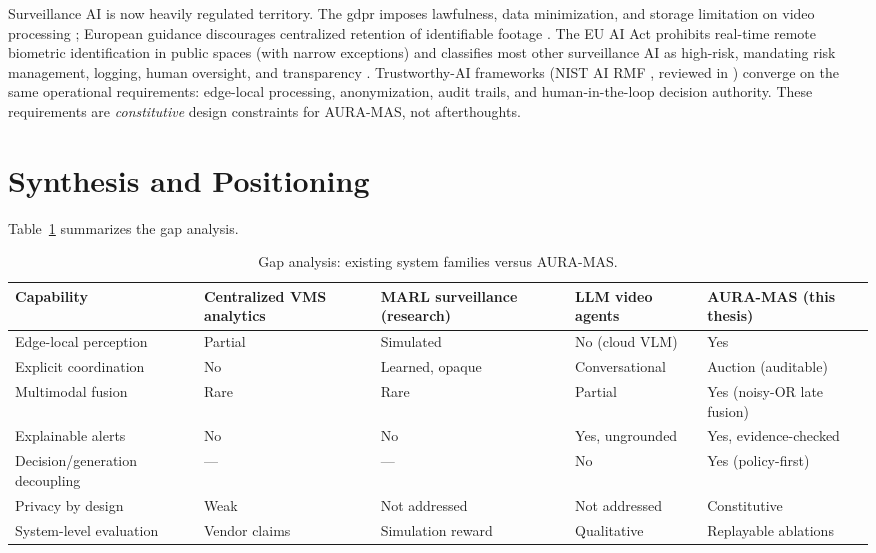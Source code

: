 Surveillance AI is now heavily regulated territory. The \gls{gdpr} imposes lawfulness, data minimization, and storage limitation on video processing \cite{gdpr2016}; European guidance discourages centralized retention of identifiable footage \cite{cnil2025reduced, iapp2022smartcameras}. The EU AI Act \cite{euaiact2024} prohibits real-time remote biometric identification in public spaces (with narrow exceptions) and classifies most other surveillance AI as high-risk, mandating risk management, logging, human oversight, and transparency \cite{barkane2022questioning, barkane2025prohibited, edri2024biometric, lexology2025augmented}. Trustworthy-AI frameworks (NIST AI RMF \cite{livingsecurity2026nist}, reviewed in \cite{forasoft2026trustworthy, ruf2021demystifying}) converge on the same operational requirements: edge-local processing, anonymization, audit trails, and human-in-the-loop decision authority. These requirements are \emph{constitutive} design constraints for AURA-MAS, not afterthoughts.

\section{Synthesis and Positioning}

Table~\ref{tab:sota_gap} summarizes the gap analysis.

\begin{table}[H]
\centering
\caption{Gap analysis: existing system families versus AURA-MAS.}
\label{tab:sota_gap}
\small
\begin{tabular}{p{3.6cm}p{2.2cm}p{2.2cm}p{2.2cm}p{2.6cm}}
\toprule
\textbf{Capability} & \textbf{Centralized VMS analytics} & \textbf{MARL surveillance (research)} & \textbf{LLM video agents} & \textbf{AURA-MAS (this thesis)} \\
\midrule
Edge-local perception & Partial & Simulated & No (cloud VLM) & Yes \\
Explicit coordination & No & Learned, opaque & Conversational & Auction (auditable) \\
Multimodal fusion & Rare & Rare & Partial & Yes (noisy-OR late fusion) \\
Explainable alerts & No & No & Yes, ungrounded & Yes, evidence-checked \\
Decision/generation decoupling & --- & --- & No & Yes (policy-first) \\
Privacy by design & Weak & Not addressed & Not addressed & Constitutive \\
System-level evaluation & Vendor claims & Simulation reward & Qualitative & Replayable ablations \\
\bottomrule
\end{tabular}
\end{table}

